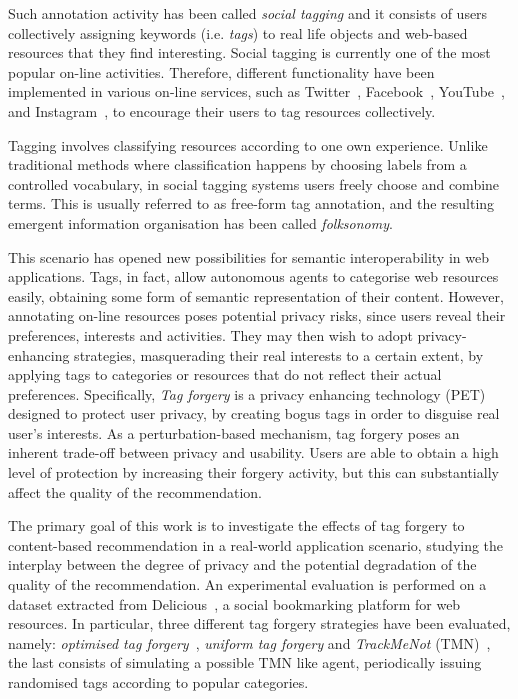 Such annotation activity has been called \emph{social tagging} and it consists of users collectively assigning keywords (i.e. \emph{tags}) to real life objects and web-based resources that they find interesting. Social tagging is currently one of the most popular on-line activities. Therefore, different functionality have been implemented in various on-line services, such as Twitter~\cite{twitter}, Facebook~\cite{facebook}, YouTube~\cite{youtube}, and Instagram~\cite{instagram}, to encourage their users to tag resources collectively.

Tagging involves classifying resources according to one own experience. Unlike traditional methods where classification happens by choosing labels from a controlled vocabulary, in social tagging systems users freely choose and combine terms. This is usually referred to as free-form tag annotation, and the resulting emergent information organisation has been called \emph{folksonomy}.

This scenario has opened new possibilities for semantic interoperability in web applications. Tags, in fact, allow autonomous agents to categorise web resources easily, obtaining some form of semantic representation of their content.
However, annotating on-line resources poses potential privacy risks, since users reveal their preferences, interests and activities. They may then wish to adopt privacy-enhancing strategies, masquerading their real interests to a certain extent, by applying tags to categories or resources that do not reflect their actual preferences. Specifically, \emph{Tag forgery} is a privacy enhancing technology (PET) designed to protect user privacy, by creating bogus tags in order to disguise real user's interests. As a perturbation-based mechanism, tag forgery poses an inherent trade-off between privacy and usability. Users are able to obtain a high level of protection by increasing their forgery activity, but this can substantially affect the quality of the recommendation.

The primary goal of this work is to investigate the effects of tag forgery to content-based recommendation in a real-world application scenario, studying the interplay between the degree of privacy and the potential degradation of the quality of the recommendation. An experimental evaluation is performed on a dataset extracted from Delicious~\cite{delicious}, a social bookmarking platform for web resources. In particular, three different tag forgery strategies have been evaluated, namely: \emph{optimised tag forgery}~\cite{Rebollo10IT}, \emph{uniform tag forgery} and \emph{TrackMeNot} (TMN)~\cite{Howe06B}, the last consists of simulating a possible TMN like agent, periodically issuing randomised tags according to popular categories.

